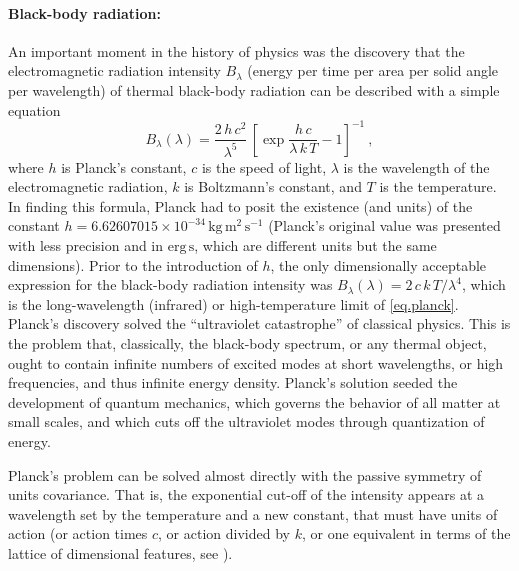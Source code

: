 \documentclass{article} %
\newcommand{\unit}[1]{\mathrm{#1}}
\newcommand{\kg}{\unit{kg}}
\newcommand{\m}{\unit{m}}
\newcommand{\s}{\unit{s}}
\begin{document}
\paragraph{Black-body radiation:}
An important moment in the history of physics was the discovery that the electromagnetic radiation intensity $B_\lambda$ (energy per time per area per solid angle per wavelength) of thermal black-body radiation can be described with a simple equation \citep{planck}
\begin{equation} \label{eq.planck}
    B_\lambda(\lambda) = \frac{2\,h\,c^2}{\lambda^5}\,\left[\exp\frac{h\,c}{\lambda\,k\,T} - 1\right]^{-1} ~,
\end{equation}
where $h$ is Planck's constant,
$c$ is the speed of light,
$\lambda$ is the wavelength of the electromagnetic radiation,
$k$ is Boltzmann's constant,
and $T$ is the temperature.
In finding this formula, Planck had to posit the existence (and units) of the constant $h=6.62607015\times 10^{-34}\,\kg\,\m^2\,\s^{-1}$ (Planck's original value was presented with less precision and in $\mathrm{erg}\,\s$, which are different units but the same dimensions).
Prior to the introduction of $h$, the only dimensionally acceptable expression for the black-body radiation intensity was $B_\lambda(\lambda)=2\,c\,k\,T/\lambda^4$, which is the long-wavelength (infrared) or high-temperature limit of \eqref{eq.planck}.
Planck's discovery solved the ``ultraviolet catastrophe'' of classical physics.
This is the problem that, classically, the black-body spectrum, or any thermal object, ought to contain infinite numbers of excited modes at short wavelengths, or high frequencies, and thus infinite energy density.
Planck's solution seeded the development of quantum mechanics, which governs the behavior of all matter at small scales, and which cuts off the ultraviolet modes through quantization of energy.

Planck's problem can be solved almost directly with the passive symmetry of units covariance.
That is, the exponential cut-off of the intensity appears at a wavelength set by the temperature and a new constant, that must have units of action (or action times $c$, or action divided by $k$, or one equivalent in terms of the lattice of dimensional features, see \citealt{villar2022dimensionless}).
\end{document}
